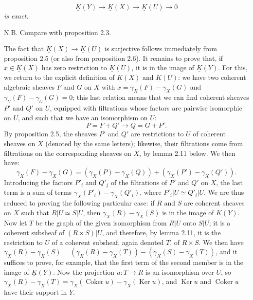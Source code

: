 %
\begin{equation}\tag{2.30}
 \underline K(Y)\longrightarrow\underline K(X)\longrightarrow\underline K(U)\longrightarrow 0
\end{equation}
\emph{is exact.}

N.B. Compare with proposition 2.3.

The fact that $\underline K(X)\longrightarrow\underline K(U)$ is surjective follows immediately from proposition 2.5 (or also from proposition 2.6). It remains to prove that, if $x\in\underline K(X)$ has zero restriction to $\underline K(U)$, it is in the image of $\underline K(Y)$. For this, we return to the explicit definition of $\underline K(X)$ and $\underline K(U)$: we have two coherent algebraic sheaves $F$ and $G$ on $X$ with $x=\gamma_X(F)-\gamma_X(G)$ and $\gamma_U(F)-\gamma_U(G)=0$; this last relation means that we can find coherent sheaves $P'$ and $Q'$ on $U$, equipped with filtrations whose factors are pairwise isomorphic on $U$, and such that we have an isomorphism on $U$:
\[
 P=F+Q'\longrightarrow Q=G+P'.
\]
By proposition 2.5, the sheaves $P'$ and $Q'$ are restrictions to $U$ of coherent sheaves on $X$ (denoted by the same letters); likewise, their filtrations come from filtrations on the corresponding sheaves on $X$, by lemma 2.11 below. We then have:
\[
 \gamma_X(F)-\gamma_X(G)=(\gamma_X(P)-\gamma_X(Q))+(\gamma_X(P')-\gamma_X(Q')).
\]
Introducing the factors $P'_i$ and $Q'_j$ of the filtrations of $P'$ and $Q'$ on $X$, the last term is a sum of terms $\gamma_X(P'_i)-\gamma_X(Q'_i)$, where $P'_i|U\simeq Q'_i|U$. We are thus reduced to proving the following particular case: if $R$ and $S$ are coherent sheaves on $X$ such that $R|U\simeq S|U$, then $\gamma_X(R)-\gamma_X(S)$ is in the image of $\underline K(Y)$. Now let $T$ be the graph of the given isomorphism from $R|U$ onto $S|U$; it is a coherent subsheaf of $(R\times S)|U$, and therefore, by lemma 2.11, it is the restriction to $U$ of a coherent subsheaf,
%
again
denoted $T$, of $R\times S$. We then have $\gamma_X(R)-\gamma_X(S)=(\gamma_X(R)-\gamma_X(T))-(\gamma_X(S)-\gamma_X(T))$, and it suffices to prove, for example, that the first term of the second member is in the image of $\underline K(Y)$. Now the projection $u:T\longrightarrow R$ is an isomorphism over $U$, so $\gamma_X(R)-\gamma_X(T)=\gamma_X(\operatorname{Coker}u)-\gamma_X(\operatorname{Ker}u)$, and $\operatorname{Ker}u$ and $\operatorname{Coker}u$ have their support in $Y$.

